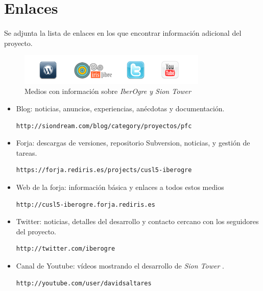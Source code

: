 \documentclass[16pt,spanish]{article}
\def \proyecto{\emph {IberOgre y Sion Tower} }
\def \juego{\emph {Sion Tower} }
\begin{document}
\section{Enlaces}

\paragraph{}
Se adjunta la lista de enlaces en los que encontrar información adicional
del proyecto.

\begin{figure}[H]
    \centering
        \includegraphics[width=9cm]{img/enlaces.png} 
    \caption{Medios con información sobre \proyecto}
    \label{img:enlaces}
\end{figure}

\begin{itemize}
    \item Blog: noticias, anuncios, experiencias, anécdotas y documentación.
    \begin{verbatim}http://siondream.com/blog/category/proyectos/pfc\end{verbatim}
    \item Forja: descargas de versiones, repositorio Subversion, noticias, y gestión de tareas.
    \begin{verbatim}https://forja.rediris.es/projects/cusl5-iberogre\end{verbatim}
    \item Web de la forja: información básica y enlaces a todos estos medios
    \begin{verbatim}http://cusl5-iberogre.forja.rediris.es\end{verbatim}
    \item Twitter: noticias, detalles del desarrollo y contacto cercano
    con los seguidores del proyecto.
    \begin{verbatim}http://twitter.com/iberogre\end{verbatim}
    \item Canal de Youtube: vídeos mostrando el desarrollo de \juego.
    \begin{verbatim}http://youtube.com/user/davidsaltares\end{verbatim}
\end{itemize}
\end{document}
